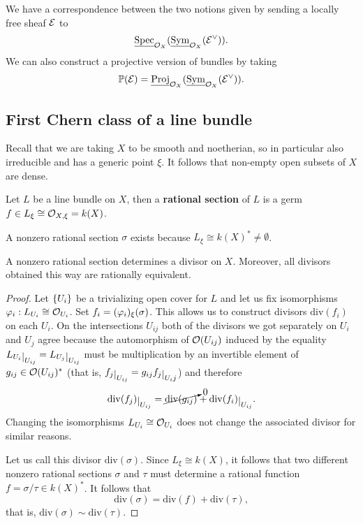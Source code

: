 \begin{remark}
We have a correspondence between the two notions given by sending a locally free sheaf $\mathcal{E}$ to 
\[\underline{\operatorname{Spec}}_{\mathcal{O}_X}(\underline{\operatorname{Sym}}_{\mathcal{O}_X}(\mathcal{E}^\vee)).\]
We can also construct a projective version of bundles by taking
\[\mathbb{P}(\mathcal{E})=\underline{\operatorname{Proj}}_{\mathcal{O}_X}(\underline{\operatorname{Sym}}_{\mathcal{O}_X}(\mathcal{E}^\vee)).\]
\end{remark}




\subsection{First Chern class of a line bundle}

Recall that we are taking $X$ to be smooth and noetherian, so in particular also irreducible and has a generic point $\xi$. It follows that non-empty open subsets of $X$ are dense.


\begin{definition}[]
Let $L$ be a line bundle on $X$, then a \textbf{rational section} of $L$ is a germ $f\in L_\xi\cong\mathcal{O}_{X,\xi}=k(X)$.
\end{definition}


\begin{remark}
A nonzero rational section $\sigma$ exists because $L_\xi\cong k(X)^\ast\neq \emptyset$. 
\end{remark}

\begin{proposition}[]
A nonzero rational section determines a divisor on $X$. Moreover, all divisors obtained this way are rationally equivalent.
\end{proposition}
\begin{proof}
Let $\left\{{U_i}\right\}$ be a trivializing open cover for $L$ and let us fix isomorphisms $\varphi_i:L_{U_i}\cong \mathcal{O}_{U_i}$. Set $f_i=(\varphi_i)_\xi(\sigma)$. This allows us to construct divisors $\mathrm{div}(f_i)$ on each $U_i$. On the intersections $U_{ij}$ both of the divisors we got separately on $U_i$ and $U_j$ agree because the automorphism of $\mathcal{O}(U_{ij})$ induced by the equality $L_{U_{i}}\res{U_{ij}}=L_{U_j}\res{U_{ij}}$ must be multiplication by an invertible element of $g_{ij}\in \mathcal{O}(U_{ij})^\ast$ (that is, $f_j\res{U_{ij}}=g_{ij}f_j\res{U_ij}$) and therefore
\[\mathrm{div}(f_j)\res{U_{ij}}=\cancelto{0}{\mathrm{div}(g_{ij})}+\mathrm{div}(f_i)\res{U_{ij}}.\]
Changing the isomorphisms $L_{U_i}\cong \mathcal{O}_{U_i}$ does not change the associated divisor for similar reasons.

Let us call this divisor $\mathrm{div}(\sigma)$.
Since $L_\xi\cong k(X)$, it follows that two different nonzero rational sections $\sigma$ and $\tau$ must determine a rational function $f=\sigma/\tau\in k(X)^\ast$. It follows that
\[\mathrm{div}(\sigma)=\mathrm{div}(f)+\mathrm{div}(\tau),\]
that is, $\mathrm{div}(\sigma)\sim \mathrm{div}(\tau)$.
\end{proof}

